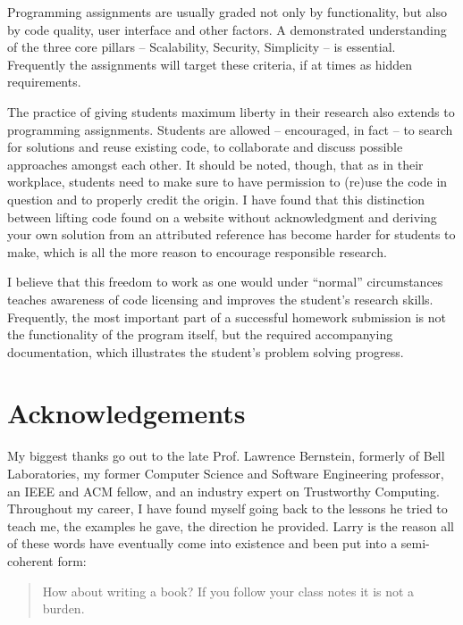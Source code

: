 Programming assignments are usually graded not only by
functionality, but also by code quality, user
interface and other factors.  A demonstrated
understanding of the three core pillars --
Scalability, Security, Simplicity -- is essential.
Frequently the assignments will target these criteria,
if at times as hidden requirements.

The practice of giving students maximum liberty in
their research also extends to programming
assignments.  Students are allowed -- encouraged, in
fact -- to search for solutions and reuse existing
code, to collaborate and discuss possible approaches
amongst each other.  It should be noted, though, that
as in their workplace, students need to make sure to
have permission to (re)use the code in question and to
properly credit the origin.  I have found that this
distinction between lifting code found on a website
without acknowledgment and deriving your own solution
from an attributed reference has become harder for
students to make, which is all the more reason to
encourage responsible research.

I believe that this freedom to work as one would under
``normal'' circumstances teaches awareness of code
licensing and improves the student's research skills.
Frequently, the most important part of a successful
homework submission is not the functionality of the
program itself, but the required accompanying
documentation, which illustrates the student's problem
solving progress.

\section*{Acknowledgements}

My biggest thanks go out to the late Prof. Lawrence
Bernstein, formerly
of Bell Laboratories, my
former Computer Science and Software Engineering
professor, an IEEE and ACM
fellow, and an industry expert on Trustworthy
Computing.  Throughout my career, I have found myself
going back to the lessons he tried to teach me, the
examples he gave, the direction he provided.  Larry is
the reason all of these words have eventually come
into existence and been put into a semi-coherent
form:

\begin{quote}
How about writing a book? If you follow your class
notes it is not a burden.
\end{quote}

